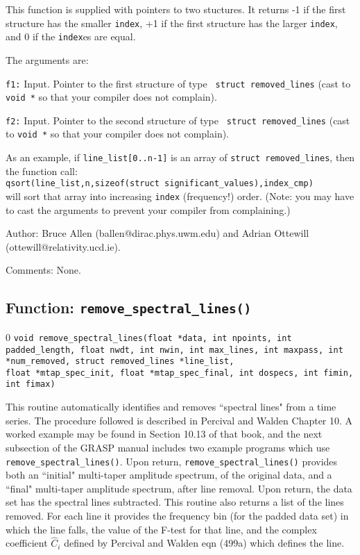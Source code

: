 This function is supplied with pointers to two stuctures.  It returns
-1 if the first structure has the smaller {\tt index},
+1 if the first structure has the larger {\tt index}, and 0 if the
{\tt index}es are equal.

The arguments are:
\begin{description}
\item{\tt f1:} Input.  Pointer to the first structure of type {\tt
struct removed\_lines} (cast to {\tt void *} so that your compiler does not complain).
\item{\tt f2:} Input.  Pointer to the second structure of type {\tt
struct removed\_lines} (cast to {\tt void *} so that your compiler does not complain).
\end{description}

As an example, if {\tt line\_list[0..n-1]} is an array of  {\tt struct removed\_lines}, then
the function call:\\
{\tt qsort(line\_list,n,sizeof(struct significant\_values),index\_cmp) }\\
will sort that array into increasing {\tt index} (frequency!) order.
(Note: you may have to cast the arguments to prevent your compiler
from complaining.)
\begin{description}
\item{Author:}
Bruce Allen (ballen@dirac.phys.uwm.edu) and Adrian Ottewill
(ottewill@relativity.ucd.ie).
\item{Comments:}
None.
\end{description}
\clearpage

\subsection{Function: {\tt remove\_spectral\_lines()} }
\setcounter{equation}0
{\tt void remove\_spectral\_lines(float *data, int npoints, int
padded\_length, float nwdt, int nwin, int max\_lines, int maxpass, int *num\_removed,
struct removed\_lines *line\_list,\\ float *mtap\_spec\_init, float
*mtap\_spec\_final, int dospecs, int fimin, int fimax) }

This routine automatically identifies and removes ``spectral lines"
from a time series.  The procedure followed is described in Percival
and Walden Chapter 10.  A worked example may be found in Section 10.13
of that book, and the next subsection of the GRASP manual includes two
example programs which use {\tt remove\_spectral\_lines()}.  Upon return,
{\tt remove\_spectral\_lines()} provides both an ``initial" multi-taper
amplitude spectrum, of the original data, and a ``final" multi-taper 
amplitude spectrum, after line removal.  
Upon return, the data set has the spectral lines
subtracted.  This routine also returns a list of the lines removed.
For each line it provides the frequency bin (for the padded data set)
in which the line falls, the value of the F-test for that line, and the
complex coefficient $\hat C_i$ defined by Percival and Walden eqn (499a)
which defines the line.

